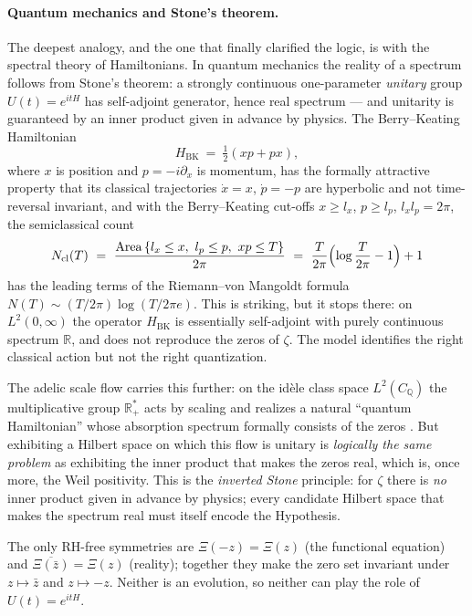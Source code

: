 \documentclass[11pt]{amsart}
\theoremstyle{definition}
\theoremstyle{remark}
\theoremstyle{definition}
\begin{document}
\paragraph{Quantum mechanics and Stone's theorem.} The deepest analogy, and the one that finally clarified
the logic, is with the spectral theory of Hamiltonians. In quantum mechanics the reality of a spectrum
follows from Stone's theorem: a strongly continuous one-parameter \emph{unitary} group $U(t)=e^{itH}$ has
self-adjoint generator, hence real spectrum --- and unitarity is guaranteed by an inner product given in
advance by physics. The Berry--Keating Hamiltonian \cite{BerryKeating}
\[
   H_{\mathrm{BK}}\ =\ \tfrac12(xp+px),
\]
where $x$ is position and $p=-i\partial_x$ is momentum, has the formally attractive property that its
classical trajectories $\dot x=x$, $\dot p=-p$ are hyperbolic and not time-reversal invariant, and with
the Berry--Keating cut-offs $x\ge l_x$, $p\ge l_p$, $l_xl_p=2\pi$, the semiclassical count
\[
   N_{\mathrm{cl}}(T)\ =\ \frac{\mathrm{Area}\,\{l_x\le x,\ l_p\le p,\ xp\le T\}}{2\pi}
   \ =\ \frac{T}{2\pi}\Bigl(\log\frac{T}{2\pi}-1\Bigr)+1
\]
has the leading terms of the Riemann--von Mangoldt formula $N(T)\sim(T/2\pi)\log(T/2\pi e)$.
This is striking, but it stops there: on $L^2(0,\infty)$ the operator $H_{\mathrm{BK}}$ is essentially
self-adjoint with purely continuous spectrum $\mathbb R$, and does not reproduce the zeros of $\zeta$. The model
identifies the right classical action but not the right quantization.

The adelic scale flow carries this further: on the id\`ele class space $L^2(C_{\mathbb Q})$ the
multiplicative group $\mathbb R_+^*$ acts by scaling and realizes a natural ``quantum Hamiltonian'' whose
absorption spectrum formally consists of the zeros \cite{connes1999}. But exhibiting a Hilbert space on
which this flow is unitary is \emph{logically the same problem} as exhibiting the inner product that makes
the zeros real, which is, once more, the Weil positivity. This is the \emph{inverted Stone} principle: for
$\zeta$ there is \emph{no} inner product given in advance by physics; every candidate Hilbert space that
makes the spectrum real must itself encode the Hypothesis.

The only RH-free symmetries are $\Xi(-z)=\Xi(z)$ (the functional equation) and
$\overline{\Xi(\bar z)}=\Xi(z)$ (reality); together they make the zero set invariant under $z\mapsto\bar z$
and $z\mapsto-z$. Neither is an evolution, so neither can play the role of $U(t)=e^{itH}$.
\end{document}

